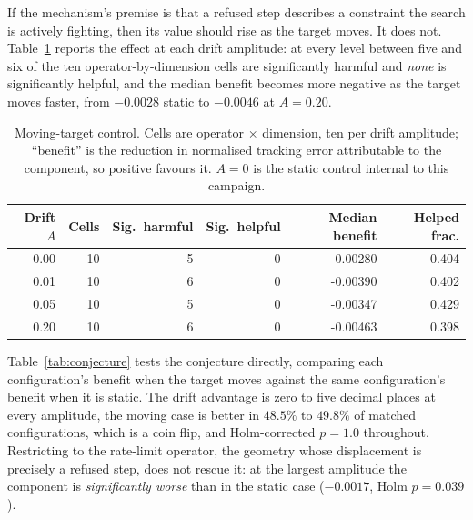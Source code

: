 \documentclass[11pt,a4paper]{article}
\begin{document}
If the mechanism's premise is that a refused step describes a constraint the search is
actively fighting, then its value should rise as the target moves. It does not.
Table~\ref{tab:drift} reports the effect at each drift amplitude: at every level between
five and six of the ten operator-by-dimension cells are significantly harmful and
\emph{none} is significantly helpful, and the median benefit becomes more negative as the
target moves faster, from $-0.0028$ static to $-0.0046$ at $A = 0.20$.

\begin{table}[htbp]
\centering
\caption{Moving-target control. Cells are operator $\times$ dimension, ten per drift
amplitude; ``benefit'' is the reduction in normalised tracking error attributable to the
component, so positive favours it. $A = 0$ is the static control internal to this
campaign.}
\label{tab:drift}
\small
\begin{tabular}{rrrrrr}
\toprule
Drift $A$ & Cells & Sig.\ harmful & Sig.\ helpful & Median benefit & Helped frac. \\
\midrule
0.00 & 10 & 5 & 0 & -0.00280 & 0.404 \\
0.01 & 10 & 6 & 0 & -0.00390 & 0.402 \\
0.05 & 10 & 5 & 0 & -0.00347 & 0.429 \\
0.20 & 10 & 6 & 0 & -0.00463 & 0.398 \\
\bottomrule
\end{tabular}
\end{table}

Table~\ref{tab:conjecture} tests the conjecture directly, comparing each configuration's
benefit when the target moves against the same configuration's benefit when it is
static. The drift advantage is zero to five decimal places at every amplitude, the
moving case is better in $48.5\%$ to $49.8\%$ of matched configurations, which is a coin
flip, and Holm-corrected $p = 1.0$ throughout. Restricting to the rate-limit operator,
the geometry whose displacement is precisely a refused step, does not rescue it: at the
largest amplitude the component is \emph{significantly worse} than in the static case
($-0.0017$, Holm $p = 0.039$).
\end{document}
